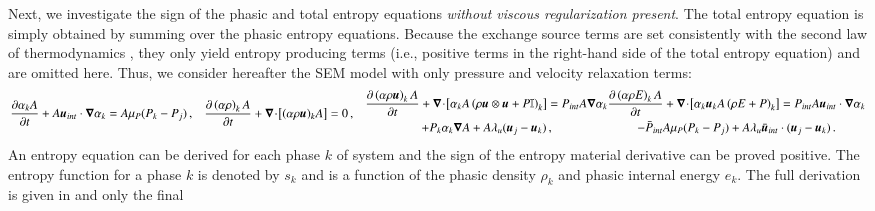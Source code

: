 Next, we investigate the sign of the phasic and total entropy equations \emph{without viscous regularization present}. 
The total entropy equation is simply obtained by summing over the phasic entropy equations. Because the exchange source terms are set consistently with the second 
law of thermodynamics \cite{BaerNunziato,PassmanNunziato}, they only yield entropy producing terms (i.e., positive 
terms in the right-hand side of the total entropy equation) and are omitted here. Thus, we consider hereafter the SEM model with only 
pressure and velocity relaxation terms:
\begin{subequations}\label{eq:liq-7-eqn-sect5_no_exchange}
\begin{align}
  \label{eqn:multi-d-7-eqn-liq-vol_no_exchange}
  \frac{\partial \alpha_{k} A}{\partial t} + A\mbold u_{int} \cdot \grad \alpha_{k}
  &= A \mu_P (P_{k} - P_{j}) \,,
\end{align}
\begin{align}
  \label{multi-d-7-equ-liq_no_exchange}
  \frac{\partial \left( \alpha \rho \right)_{k} A}{\partial t}
  + \div \left[ (\alpha \rho \mbold u)_{k} A \right]
  &= 0 \,,
\end{align}
\begin{multline}
  \frac{\partial \left( \alpha \rho \mbold u \right)_{k} A}{\partial t}
  + \div \left[ \alpha_{k} A \left( \rho \mbold u \otimes \mbold u + P \mathbb{I} \right)_{k} \right]
  = P_{int} A \grad \alpha_{k} \\ + P_{k} \alpha_{k} \grad A
  + A \lambda_u (\mbold u_{j} - \mbold u_{k})\,,
\end{multline}
\begin{multline}
  \frac{\partial \left( \alpha \rho E \right)_{k} A}{\partial t}
  + \div \left[ \alpha_{k} \mbold u_{k} A \left( \rho E + P \right)_{k} \right]
  = P_{int} A \mbold u_{int} \cdot \grad \alpha_{k} \\ - \bar{P}_{int} A \mu_P (P_{k} - P_{j})
  + A \lambda_u \bar{\mbold u}_{int} \cdot (\mbold u_{j} - \mbold u_{k}) \,.
\end{multline}
\end{subequations}
%
An entropy equation can be derived for each phase $k$ of system 
%
and the sign of the entropy material derivative can be proved positive. The entropy function for a phase $k$ is denoted by $s_k$ and is a function of 
the phasic density $\rho_k$ and phasic internal energy $e_k$. The full derivation is given in  and only the final 
